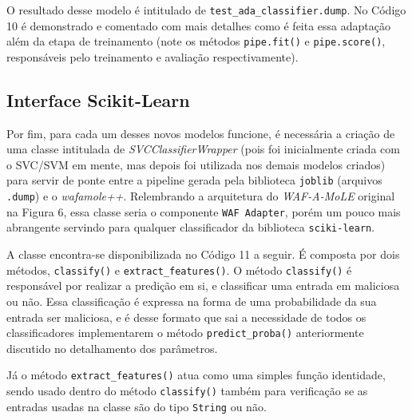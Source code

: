 O resultado desse modelo é intitulado de \verb+test_ada_classifier.dump+. No Código 10 é demonstrado e comentado com mais detalhes como é feita essa adaptação além da etapa de treinamento (note os métodos \verb+pipe.fit()+ e \verb+pipe.score()+, responsáveis pelo treinamento e avaliação respectivamente).

\label{sec:codigos:modelos}
\bigskip

\subsection{Interface Scikit-Learn}
Por fim, para cada um desses novos modelos funcione, é necessária a criação de uma classe intitulada de \textit{SVCClassifierWrapper} (pois foi inicialmente criada com o SVC/SVM em mente, mas depois foi utilizada nos demais modelos criados) para servir de ponte entre a pipeline gerada pela biblioteca \verb+joblib+ (arquivos \verb+.dump+) e o \textit{wafamole++}. Relembrando a arquitetura do \textit{WAF-A-MoLE} original na Figura 6, essa classe seria o componente \verb+WAF Adapter+, porém um pouco mais abrangente servindo para qualquer classificador da biblioteca  \verb+sciki-learn+.

A classe encontra-se disponibilizada no Código 11 a seguir. É composta por dois métodos, \verb+classify()+ e \verb+extract_features()+. O método \verb+classify()+ é responsável por realizar a predição em si, e classificar uma entrada em maliciosa ou não. Essa classificação é expressa na forma de uma probabilidade da sua entrada ser maliciosa, e é desse formato que sai a necessidade de todos os classificadores implementarem o método \verb+predict_proba()+ anteriormente discutido no detalhamento dos parâmetros. 

Já o método \verb+extract_features()+ atua como uma simples função identidade, sendo usado dentro do método \verb+classify()+ também para verificação se as entradas usadas na classe são do tipo \verb+String+ ou não.

\label{sec:codigos:modelos}
\bigskip



